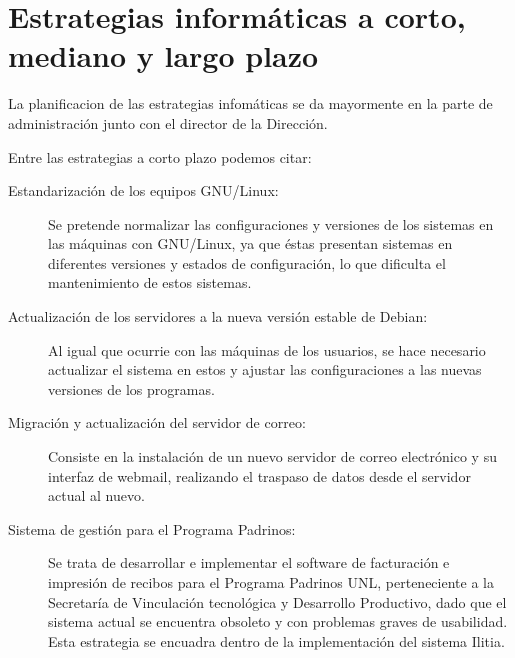\documentclass[a4paper,11pt,oneside]{article}
\begin{document}
\section{Estrategias informáticas a corto, mediano y largo plazo}
%
La planificacion de las estrategias infomáticas se da mayormente en la
parte de administración junto con el director de la Dirección.

Entre las estrategias a corto plazo podemos citar:
%
\begin{description}
%
\item[Estandarización de los equipos GNU/Linux:]
  Se pretende normalizar las configuraciones y versiones de los
  sistemas en las máquinas con GNU/Linux, ya que éstas presentan
  sistemas en diferentes versiones y estados de configuración, lo que
  dificulta el mantenimiento de estos sistemas.
%
\item[Actualización de los servidores a la nueva versión estable de
  Debian:]
  Al igual que ocurrie con las máquinas de los usuarios,
  se hace necesario actualizar el sistema en estos y ajustar las
  configuraciones a las nuevas versiones de los programas.
%
\item[Migración y actualización del servidor de correo:]
  Consiste en la instalación de un nuevo servidor de correo
  electrónico y su interfaz de webmail, realizando el traspaso de
  datos desde el servidor actual al nuevo.
%
\item[Sistema de gestión para el Programa Padrinos:]
  Se trata de desarrollar e implementar el software de facturación e
  impresión de recibos para el Programa Padrinos UNL, perteneciente a
  la Secretaría de Vinculación tecnológica y Desarrollo Productivo,
  dado que el sistema actual se encuentra obsoleto y con problemas
  graves de usabilidad. Esta estrategia se encuadra dentro de la
  implementación del sistema Ilitia.
%
\end{description}
\end{document}
